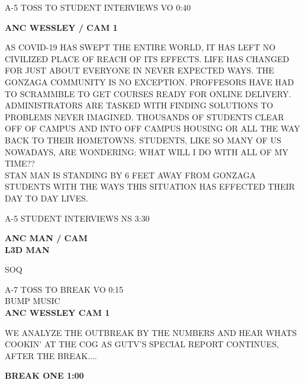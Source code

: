 \documentclass{article}
\newenvironment{changemargin}[2]{%
\begin{list}{}{%
\setlength{\topsep}{0pt}%
\setlength{\leftmargin}{#1}%
\setlength{\rightmargin}{#2}%
\setlength{\listparindent}{\parindent}%
\setlength{\itemindent}{\parindent}%
\setlength{\parsep}{\parskip}%
}%
\item[]}{\end{list}}
\begin{document}
\begin{flushleft}
\begin{changemargin}{-3cm}{-5cm}
\end{changemargin}
\vspace{8.5mm}

\begin{changemargin}{-3cm}{-5cm}
\color{red}
A-5     TOSS TO STUDENT INTERVIEWS VO   0:40

\color{black}

\textbf{
ANC WESSLEY / CAM 1}
\end{changemargin}


\begin{changemargin}{4cm}{1cm}
AS COVID-19 HAS SWEPT THE ENTIRE WORLD, IT HAS LEFT NO CIVILIZED PLACE OF REACH OF ITS EFFECTS. LIFE HAS CHANGED FOR JUST ABOUT EVERYONE IN NEVER EXPECTED WAYS. THE GONZAGA COMMUNITY IS NO EXCEPTION. PROFFESORS HAVE HAD TO SCRAMMBLE TO GET COURSES READY FOR ONLINE DELIVERY. ADMINISTRATORS ARE TASKED WITH FINDING SOLUTIONS TO PROBLEMS NEVER IMAGINED. THOUSANDS OF STUDENTS CLEAR OFF OF CAMPUS AND INTO OFF CAMPUS HOUSING OR ALL THE WAY BACK TO THEIR HOMETOWNS. STUDENTS, LIKE SO MANY OF US NOWADAYS, ARE WONDERING: WHAT WILL I DO WITH ALL OF MY TIME?? \\

STAN MAN IS STANDING BY 6 FEET AWAY FROM GONZAGA STUDENTS WITH THE WAYS THIS SITUATION HAS EFFECTED THEIR DAY TO DAY LIVES.
\end{changemargin}


\begin{changemargin}{-3cm}{-5cm}
\color{red}
A-5     STUDENT INTERVIEWS NS    3:30

\color{black}

\textbf{
ANC MAN / CAM} \\
\textbf{
L3D MAN}

\color{red}
SOQ

\vspace{25mm}
A-7 TOSS TO BREAK VO    0:15\\
BUMP MUSIC \\
\color{black}
\textbf{ANC WESSLEY CAM 1}
\end{changemargin}

\begin{changemargin}{2cm}{1cm}
WE ANALYZE THE OUTBREAK BY THE NUMBERS AND HEAR WHATS COOKIN' AT THE COG AS GUTV'S SPECIAL REPORT CONTINUES, AFTER THE BREAK....
\end{changemargin}

\begin{changemargin}{4cm}{1cm}
\color{blue}
\textbf{BREAK ONE 1:00}
\end{changemargin}











\end{flushleft}
\end{document}
